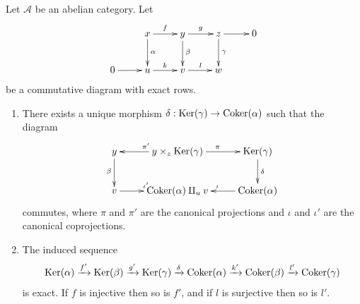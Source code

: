 \begin{lemma}
\label{lemma-snake}
Let $\mathcal{A}$ be an abelian category. Let
$$
\xymatrix{
& x \ar[r]^f \ar[d]^\alpha &
y \ar[r]^g \ar[d]^\beta &
z \ar[r] \ar[d]^\gamma &
0 \\
0 \ar[r] & u \ar[r]^k & v \ar[r]^l & w
}
$$
be a commutative diagram with exact rows.
\begin{enumerate}
\item There exists a unique morphism
$\delta : \mathop{\mathrm{Ker}}(\gamma) \to \mathop{\mathrm{Coker}}(\alpha)$
such that the diagram
$$
\xymatrix{
y \ar[d]_\beta &
y \times_z \Ker(\gamma) \ar[l]_{\pi'} \ar[r]^{\pi} &
\Ker(\gamma) \ar[d]^\delta \\
v \ar[r]^{\iota'} & \Coker(\alpha) \amalg_u v &
\Coker(\alpha) \ar[l]_\iota
}
$$
commutes, where $\pi$ and $\pi'$ are the canonical projections
and $\iota$ and $\iota'$ are the canonical coprojections.
\item The induced sequence
$$
\mathop{\mathrm{Ker}}(\alpha) \xrightarrow{f'} \mathop{\mathrm{Ker}}(\beta) \xrightarrow{g'}
\mathop{\mathrm{Ker}}(\gamma) \xrightarrow{\delta} \mathop{\mathrm{Coker}}(\alpha) \xrightarrow{k'}
\mathop{\mathrm{Coker}}(\beta) \xrightarrow{l'} \mathop{\mathrm{Coker}}(\gamma)
$$
is exact. If $f$ is injective then so is $f'$, and if $l$ is
surjective then so is $l'$.
\end{enumerate}
\end{lemma}

